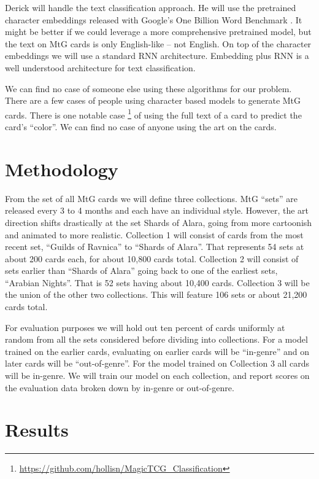 \documentclass{article}
\begin{document}
Derick will handle the text classification approach.
He will use the pretrained character embeddings
released with Google's One Billion Word Benchmark
\cite{one-billion-words}.
It might be better if we could leverage a more comprehensive pretrained model,
but the text on MtG cards is only English-like -- not English.
On top of the character embeddings
we will use a standard RNN architecture.
Embedding plus RNN is a well understood architecture for text classification.

We can find no case of someone else using these algorithms for our problem.
There are a few cases of people using character based models
to generate MtG cards.
There is one notable case
\footnote{\url{https://github.com/hollisn/MagicTCG_Classification}}
of using the full text of a card to predict the card's ``color''.
We can find no case of anyone using the art on the cards.

\section*{Methodology}

From the set of all MtG cards we will define three collections.
MtG ``sets'' are released every
3 to 4 months and each have an individual style.
However,
the art direction shifts drastically at the set Shards of Alara,
going from more cartoonish and animated to more realistic.
Collection 1 will consist of cards from the most recent set,
``Guilds of Ravnica'' to ``Shards of Alara''.
That represents 54 sets at about 200 cards each,
for about 10,800 cards total.
Collection 2 will consist of sets earlier than ``Shards of Alara''
going back to one of the earliest sets, ``Arabian Nights''.
That is 52 sets having about 10,400 cards.
Collection 3 will be the union of the other two collections.
This will feature 106 sets or about 21,200 cards total.

For evaluation purposes
we will hold out ten percent of cards uniformly at random
from all the sets considered
before dividing into collections.
For a model trained on the earlier cards,
evaluating on earlier cards will be ``in-genre''
and on later cards will be ``out-of-genre''.
For the model trained on Collection 3
all cards will be in-genre.
We will train our model on each collection,
and report scores on the evaluation data
broken down by in-genre or out-of-genre.

\section*{Results}
\end{document}
